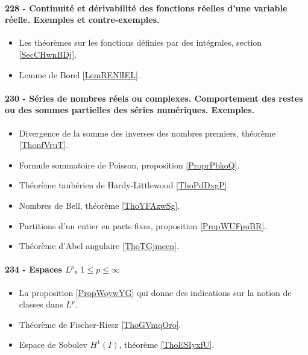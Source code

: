 \paragraph{228 - Continuité et dérivabilité des fonctions réelles d’une variable réelle. Exemples et contre-exemples.}
\begin{itemize}
    \item Les théorèmes sur les fonctions définies par des intégrales, section \ref{SecCHwnBDj}.
    \item Lemme de Borel \ref{LemRENlIEL}.
\end{itemize}
\paragraph{230 - Séries de nombres réels ou complexes. Comportement des restes ou des sommes partielles des séries numériques. Exemples.}
\begin{itemize}
    \item Divergence de la somme des inverses des nombres premiers, théorème \ref{ThonfVruT}.
    \item Formule sommatoire de Poisson, proposition \ref{ProprPbkoQ}.
    \item Théorème taubérien de Hardy-Littlewood \ref{ThoPdDxgP}.
    \item Nombres de Bell, théorème \ref{ThoYFAzwSg}.
    \item Partitions d'un entier en parts fixes, proposition \ref{PropWUFpuBR}.
    \item Théorème d'Abel angulaire \ref{ThoTGjmeen}.
\end{itemize}
\paragraph{234 - Espaces \( L^p\), \( 1\leq p\leq\infty\)}
\begin{itemize}
    \item La proposition \ref{PropWoywYG} qui donne des indications sur la notion de classes dans \( L^p\).
    \item Théorème de Fischer-Riesz \ref{ThoGVmqOro}.
    \item Espace de Sobolev \( H^1(I)\), théorème \ref{ThoESIyxfU}.
\end{itemize}
